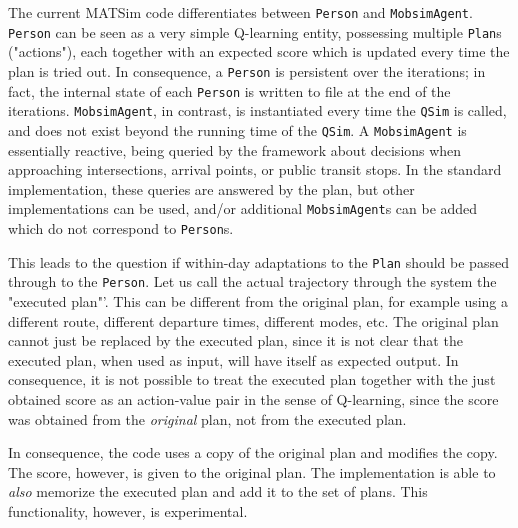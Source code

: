 
The current MATSim code differentiates between \lstinline$Person$ and \lstinline$MobsimAgent$.  
%
\lstinline$Person$ can be seen as a very simple Q-learning entity, possessing multiple \lstinline$Plan$s ("actions"), each together with an expected score which is updated every time the plan is tried out. In consequence, a \lstinline$Person$ is persistent over the iterations; in fact, the internal state of each \lstinline$Person$ is written to file at the end of the iterations.
%
\lstinline$MobsimAgent$, in contrast, is instantiated every time the \lstinline$QSim$ is called, and does not exist beyond the running time of the \lstinline$QSim$. A \lstinline$MobsimAgent$ is essentially reactive, being queried by the framework about decisions when approaching intersections, arrival points, or public transit stops. In the standard implementation, these queries are answered by the plan, but other implementations can be used, and/or additional \lstinline$MobsimAgent$s can be added which do not correspond to \lstinline$Person$s.


This leads to the question if within-day adaptations to the \lstinline$Plan$ should be passed through to the \lstinline$Person$. Let us call the actual trajectory through the system the "executed plan"'.  This can be different from the original plan, for example using a different route, different departure times, different modes, etc. The original plan cannot just be replaced by the executed plan, since it is not clear that the executed plan, when used as input, will have itself as expected output. In consequence, it is not possible to treat the executed plan together with the just obtained score as an action-value pair in the sense of Q-learning, since the score was obtained from the \emph{original} plan, not from the executed plan.

In consequence, the code uses a copy of the original plan and modifies the copy. The score, however, is given to the original plan. The implementation is able to 
%
% 
\emph{also} memorize the executed plan and add it to the set of plans. This functionality, however, is experimental.

